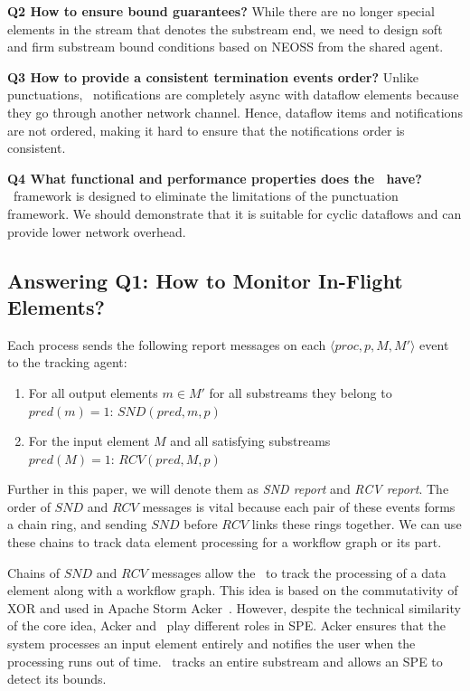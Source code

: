 {\bf Q2 How to ensure bound guarantees?} While there are no longer special elements in the stream that denotes the substream end, we need to design soft and firm substream bound conditions based on NEOSS from the shared agent. 

{\bf Q3 How to provide a consistent termination events order?} Unlike punctuations, \tracker\ notifications are completely async with dataflow elements because they go through another network channel. Hence, dataflow items and notifications are not ordered, making it hard to ensure that the notifications order is consistent.

{\bf Q4 What functional and performance properties does the \tracker\ have?} \tracker\ framework is designed to eliminate the limitations of the punctuation framework. We should demonstrate that it is suitable for cyclic dataflows and can provide lower network overhead.

\subsection*{Answering Q1: How to Monitor In-Flight Elements?}
Each process sends the following report messages on each $\langle proc, p, M, M' \rangle$ event to the tracking agent:
\begin{enumerate}
    \item For all output elements $m \in M'$ for all substreams they belong to \\ $pred(m) = 1$: $SND(pred, m, p)$
    \item For the input element $M$ and all satisfying substreams \\ $pred(M) = 1$: $RCV(pred, M, p)$
\end{enumerate}
Further in this paper, we will denote them as {\em SND report} and {\em RCV report}. The order of $SND$ and $RCV$ messages is vital because each pair of these events forms a chain ring, and sending $SND$ before $RCV$ links these rings together. We can use these chains to track data element processing for a workflow graph or its part.

Chains of $SND$ and $RCV$ messages allow the \tracker\ to track the processing of a data element along with a workflow graph. This idea is based on the commutativity of XOR and used in Apache Storm Acker~\cite{apache:storm:acker}. However, despite the technical similarity of the core idea, Acker and \tracker\ play different roles in SPE. Acker ensures that the system processes an input element entirely and notifies the user when the processing runs out of time. \tracker\ tracks an entire substream and allows an SPE to detect its bounds.

